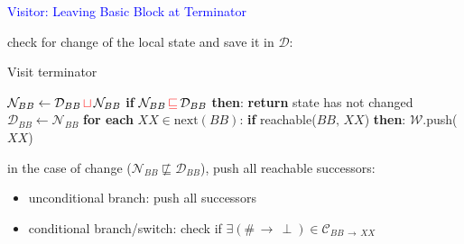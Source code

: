 \begin{frame}[fragile]{\textcolor{blue}{Visitor: Leaving Basic Block at Terminator}}

{\color{blue}check for change} of the local state and save it in $\mathcal{D}$:
\begin{algorithm}[H]
\caption{Visit terminator}
\begin{algorithmic}[1]
\State $\mathcal{N}_{BB} \gets \mathcal{D}_{BB} \,{\color{red}\sqcup}\, \mathcal{N}_{BB}$
\State \textbf{if} $\mathcal{N}_{BB} \,{\color{red}\sqsubseteq}\, \mathcal{D}_{BB}$ \textbf{then}:
\State \qquad \textbf{return}
\Comment state has not changed
\State $\mathcal{D}_{BB} \gets \mathcal{N}_{BB}$
\State \textbf{for each} $XX \in \text{next}(BB)$:
\State \qquad\textbf{if} reachable($BB,\,XX$) \textbf{then}:
\State \qquad\qquad $\mathcal{W}$.push($XX$)
\EndProcedure
\end{algorithmic}
\end{algorithm}
in the case of change ($\mathcal{N}_{BB} \not\sqsubseteq \mathcal{D}_{BB}$), {\color{blue}push all reachable successors}:
\begin{itemize}
\item unconditional branch: push all successors
\item {\color{blue}conditional branch/switch}: check if $\exists (\#\,\rightarrow\,\perp)\in \mathcal{C}_{BB \,\rightarrow\, XX}$
\end{itemize}
\end{frame}


